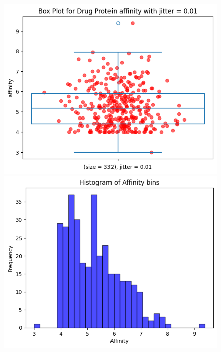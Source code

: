 \documentclass[11pt, a4paper]{article}
\begin{document}
        \begin{figure}[H]
            \centering
            \begin{minipage}{0.45\textwidth}
            \includegraphics[width=\textwidth]{boxplot2.png}
            \end{minipage}
            \hfill
            \begin{minipage}{0.45\textwidth}
            \includegraphics[width=\textwidth]{histogram.png}
            \end{minipage}
        \end{figure}
\end{document}

